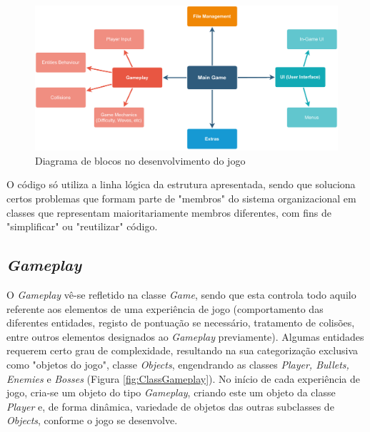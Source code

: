 \documentclass[a4paper,11pt]{article}
\begin{document}
\vspace{8pt}

\begin{figure}[]
    \centering
    \includegraphics[scale = 0.50]{2 - Esquemas/GameModulesDiagram.pdf}
    \caption{Diagrama de blocos no desenvolvimento do jogo}
    \label{fig:GameModulesDiagram}
\end{figure}

\vspace{8pt}

O código só utiliza a linha lógica da estrutura apresentada, sendo que soluciona certos problemas que formam parte de "membros" do sistema organizacional em classes que representam maioritariamente membros diferentes, com fins de "simplificar" ou "reutilizar" código.

\vspace{8pt}

\subsection*{\textit{Gameplay}}

\vspace{8pt}

O \textit{Gameplay} vê-se refletido na classe \textit{Game}, sendo que esta controla todo aquilo referente aos elementos de uma experiência de jogo (comportamento das diferentes entidades, registo de pontuação se necessário, tratamento de colisões, entre outros elementos designados ao \textit{Gameplay} previamente). Algumas entidades requerem certo grau de complexidade, resultando na sua categorização exclusiva como "objetos do jogo", classe \textit{Objects}, engendrando as classes \textit{Player, Bullets, Enemies} e \textit{Bosses} (Figura \ref{fig:ClassGameplay}). No início de cada experiência de jogo, cria-se um objeto do tipo \textit{Gameplay}, criando este um objeto da classe \textit{Player} e, de forma dinâmica, variedade de objetos das outras subclasses de \textit{Objects}, conforme o jogo se desenvolve.
\end{document}
